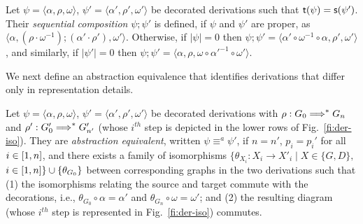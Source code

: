 \begin{definition}
\label{def:seq_com_decorated}
  Let $\psi = \langle \alpha, \rho, \omega \rangle$, $\psi' = \langle \alpha',
  \rho', \omega' \rangle$ be decorated derivations such that
  $\mathsf{t}({\psi}) = \mathsf{s}({\psi'})$. Their \emph{sequential
  composition} $\psi ; \psi'$ is defined, if $\psi$ and
  $\psi'$ are proper, as 
    $\langle \alpha, (\rho \cdot \omega^{-1}); (\alpha' \cdot \rho'), \omega' \rangle$.
  Otherwise, if $|\psi|=0$ then $\psi ; \psi' =
  \langle \alpha' \circ \omega^{-1} \circ \alpha, \rho', \omega' \rangle$, and similarly,
  if $|\psi'| = 0$ then $\psi ; \psi' =
  \langle \alpha, \rho, \omega \circ {\alpha'}^{-1} \circ \omega' \rangle$.
\end{definition}

We next define an abstraction equivalence that identifies derivations that differ
only in representation details.

\begin{definition}
  \label{de:der-equiv1}
  Let $\psi = \langle \alpha, \rho, \omega \rangle$, $\psi' = \langle \alpha',
  \rho', \omega' \rangle$ be decorated derivations with $\rho: G_0
  \stackrel{{}}{\Longrightarrow}^{*} G_n$ and $\rho': G'_0 \stackrel{{}}{\Longrightarrow}^{*} G'_{n'}$
  (whose $i^{th}$ step is depicted in the lower rows of
  Fig.~\ref{fi:der-iso}).  They are \emph{abstraction equivalent}, 
  written  $\psi \equiv^{a} \psi'$, 
  if  $n = n'$,  $p_{i} = p_{i}'$ for all $i \in [{1},{n}]$,
  and there exists a family of isomorphisms
  $\{\theta_{X_i}: X_i \rightarrow X'_i \mid X \in \{G, D\},$
  $i \in [{1},{n}] \} \cup\{\theta_{G_0}\}$
  between corresponding graphs in the two derivations such that
  (1)
    the isomorphisms relating the source and target
    commute with the decorations, i.e., $\theta_{G_0} \circ \alpha = \alpha'$
    and $\theta_{G_n} \circ \omega = \omega'$; and
  (2) 
    the resulting diagram (whose $i^{th}$ step is represented in
    Fig.~\ref{fi:der-iso}) commutes.

\end{definition}

